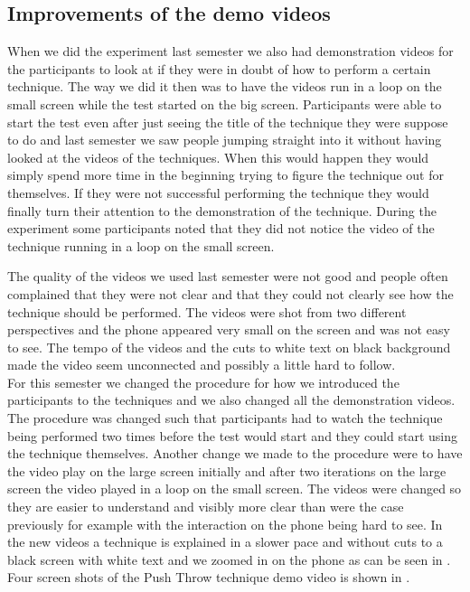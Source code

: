 \subsection*{Improvements of the demo videos}\label{sec:videoslastsemester}
When we did the experiment last semester we also had demonstration videos for the participants to look at if they were in doubt of how to perform a certain technique.
The way we did it then was to have the videos run in a loop on the small screen while the test started on the big screen.
Participants were able to start the test even after just seeing the title of the technique they were suppose to do and last semester we saw people jumping straight into it without having looked at the videos of the techniques. 
When this would happen they would simply spend more time in the beginning trying to figure the technique out for themselves.
If they were not successful performing the technique they would finally turn their attention to the demonstration of the technique.
During the experiment some participants noted that they did not notice the video of the technique running in a loop on the small screen.

The quality of the videos we used last semester were not good and people often complained that they were not clear and that they could not clearly see how the technique should be performed.
The videos were shot from two different perspectives and the phone appeared very small on the screen and was not easy to see.
The tempo of the videos and the cuts to white text on black background made the video seem unconnected and possibly a little hard to follow.\\

For this semester we changed the procedure for how we introduced the participants to the techniques and we also changed all the demonstration videos.
The procedure was changed such that participants had to watch the technique being performed two times before the test would start and they could start using the technique themselves.
Another change we made to the procedure were to have the video play on the large screen initially and after two iterations on the large screen the video played in a loop on the small screen.
The videos were changed so they are easier to understand and visibly more clear than were the case previously for example with the interaction on the phone being hard to see.
In the new videos a technique is explained in a slower pace and without cuts to a black screen with white text and we zoomed in on the phone as can be seen in .
Four screen shots of the Push Throw technique demo video is shown in .

